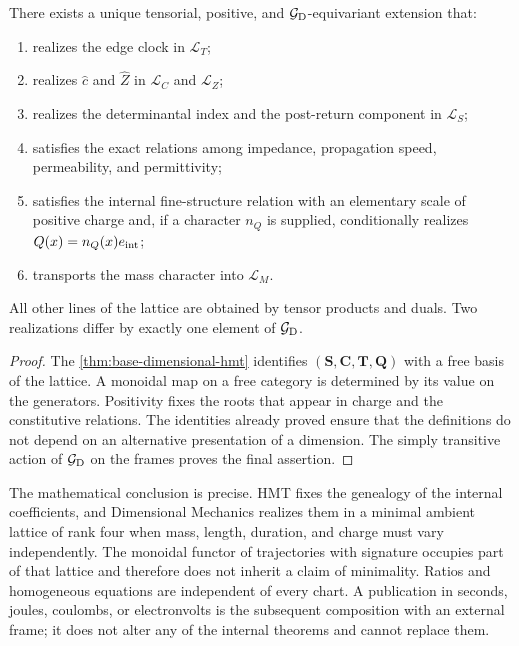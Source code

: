 \begin{theorem}
\label{thm:extension-dimensional-universal}
There exists a unique tensorial, positive, and
\(\mathcal G_{\rm D}\)-equivariant extension that:
\begin{enumerate}
 \item realizes the edge clock in \(\mathcal L_T\);
 \item realizes \(\widehat c\) and \(\widehat Z\) in
       \(\mathcal L_C\) and \(\mathcal L_Z\);
 \item realizes the determinantal index and the post-return component
       in \(\mathcal L_S\);
 \item satisfies the exact relations among impedance, propagation
       speed, permeability, and permittivity;
 \item satisfies the internal fine-structure relation with an elementary scale
       of positive charge and, if a character \(n_Q\) is supplied, conditionally realizes
       \(Q(x)=n_Q(x)e_{\rm int}\);
 \item transports the mass character into \(\mathcal L_M\).
\end{enumerate}
All other lines of the lattice are obtained by tensor products and
duals. Two realizations differ by exactly one element of
\(\mathcal G_{\rm D}\).
\end{theorem}

\begin{proof}
The \cref{thm:base-dimensional-hmt} identifies \((\mathbf S,\mathbf C,\mathbf T,\mathbf Q)\) with a free basis of the lattice. A monoidal map on a free category is determined by its value on the generators. Positivity fixes the roots that appear in charge and the constitutive relations. The identities already proved ensure that the definitions do not depend on an alternative presentation of a dimension. The simply transitive action of \(\mathcal G_{\rm D}\) on the frames proves the final assertion.
\end{proof}

The mathematical conclusion is precise. HMT fixes the genealogy of the
internal coefficients, and Dimensional Mechanics realizes them in a minimal
ambient lattice of rank four when mass, length, duration, and charge must
vary independently. The monoidal functor of trajectories with signature
occupies part of that lattice and therefore does not inherit a claim of
minimality. Ratios and homogeneous equations are independent of every chart.
A publication in seconds, joules, coulombs, or
electronvolts is the subsequent composition with an external frame; it does not alter
any of the internal theorems and cannot replace them.
